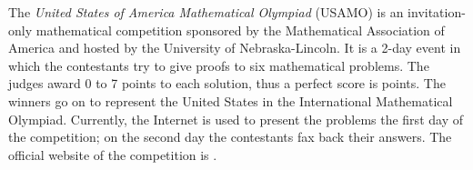 \documentclass[12pt]{article}
\begin{document}
The {\em United States of America Mathematical Olympiad} (USAMO) is an invitation-only mathematical competition sponsored by the Mathematical Association of America and hosted by the University of Nebraska-Lincoln. It is a 2-day event in which the contestants try to give proofs to six mathematical problems. The judges award 0 to 7 points to each solution, thus a perfect score is  points. The winners go on to represent the United States in the International Mathematical Olympiad. Currently, the Internet is used to present the problems the first day of the competition; on the second day the contestants fax back their answers. The official website of the competition is .
\end{document}

